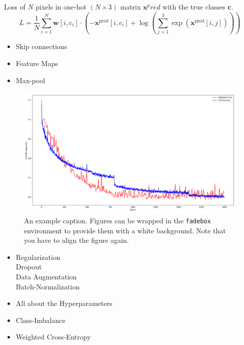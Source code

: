 \documentclass[
]{dtuposter}
\begin{document}
\begin{dtupostercontent}
Loss of \(N\) pixels in one-hot \((N \times  3)\) matrix \(\mathbf x^pred\) with the true classes \(\mathbf c\).
\[
L = \frac 1 N \sum_{i=1}^{N} \mathbf{w}[i, c_i]  \cdot 
\left( 
-\mathbf x^\text{pred}[i, c_i] + \log
\left(
\sum_{j=1}^{3}\exp(\mathbf x^\text{pred}[i, j])
\right)
\right)
\]

\begin{itemize}
	\item Skip connections
	\item Feature Maps
	\item Max-pool
\end{itemize}


\begin{figure}
	\begin{center}
			\includegraphics[width=\linewidth,origin=c]{loss}
	\end{center}
	\caption{An example caption. Figures can be wrapped in the \texttt{fadebox} 
		environment to provide them with a white background. Note that you have to align the 
		figure again.}\label{fig:example2}
\end{figure}


\begin{itemize}
	\item Regularization \\
		Dropout \\
		Data Augmentation \\
		Batch-Normalization
	
	\item All about the Hyperparameters
\end{itemize}

\begin{itemize}
	\item Class-Imbalance
	\item Weighted Cross-Entropy
	

\end{itemize}
\end{dtupostercontent}
\end{document}
